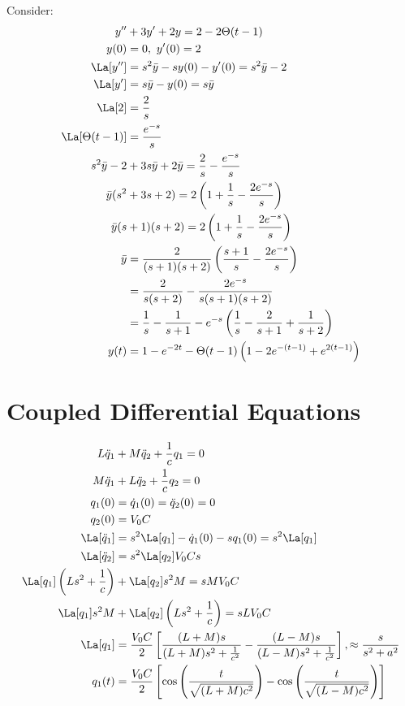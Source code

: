 \documentclass[cplx.tex]{subfiles}
\begin{document}
\begin{example}
Consider:
\begin{align}
    y'' &+ 3y' + 2y = 2 - 2\Theta(t-1) \\
    y(0) &= 0,~ y'(0) = 2 \\
    \La[y''] &= s^2\bar{y} - sy(0) - y'(0) = s^2\bar{y} - 2 \\
    \La[y'] &= s\bar{y} - y(0) = s\bar{y} \\
    \La[2] &= \frac{2}{s} \\
    \La[\Theta(t-1)] &= \frac{e^{-s}}{s} \\
    s^2\bar{y} - 2 &+ 3s\bar{y} + 2\bar{y} = \frac{2}{s} - \frac{e^{-s}}{s} \\
    \bar{y}(s^2 &+ 3s + 2) = 2\left(1 + \frac{1}{s} - \frac{2e^{-s}}{s}\right) \\
    \bar{y}(s &+1)(s+2) = 2\left(1+\frac{1}{s}-\frac{2e^{-s}}{s}\right) \\
    \bar{y} &= \frac{2}{(s+1)(s+2)}\left(\frac{s+1}{s}-\frac{2e^{-s}}{s}\right) \\
            &= \frac{2}{s(s+2)} - \frac{2e^{-s}}{s(s+1)(s+2)} \\
            &= \frac{1}{s}-\frac{1}{s+1} - e^{-s}\left(\frac{1}{s} - \frac{2}{s+1} + \frac{1}{s+2}\right) \\
    y(t) &= 1 - e^{-2t} - \Theta(t-1) \left(1-2e^{-(t-1)} + e^{2(t-1)}\right)
\end{align}
\end{example}

\section{Coupled Differential Equations}
\begin{example}
\begin{align}
    L\ddot{q}_1 &+ M\ddot{q}_2 + \frac{1}{c}q_1 = 0 \\
    M\ddot{q}_1 &+ L\ddot{q}_2 + \frac{1}{c}q_2 = 0 \\
    q_1(0) &= \dot{q}_1(0) = \ddot{q}_2(0) = 0 \\
    q_2(0) &= V_0C \\
    \La[\ddot{q}_1] &= s^2\La[q_1] - \dot{q}_1(0) - sq_1(0) = s^2\La[q_1] \\
    \La[\ddot{q}_2] &= s^2\La[q_2] V_0Cs \\
    \La[q_1]\left(Ls^2+\frac{1}{c}\right) &+ \La[q_2]s^2M = sMV_0C \\
    \La[q_1]s^2M &+ \La[q_2]\left(Ls^2+\frac{1}{c}\right) = sLV_0C \\
    \La[q_1] &= \frac{V_0C}{2} \left[\frac{(L+M)s}{(L+M)s^2 + \frac{1}{c^2}} - \frac{(L-M)s}{(L-M)s^2+\frac{1}{c^2}}\right], \approx \frac{s}{s^2+a^2} \\
    q_1(t) &= \frac{V_0C}{2}\left[\cos\left(\frac{t}{\sqrt{(L+M)c^2}}\right) - \cos\left(\frac{t}{\sqrt{(L-M)c^2}}\right)\right]
\end{align}
\end{example}
\end{document}
